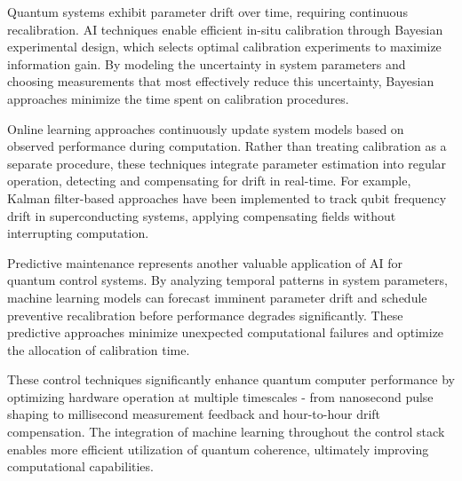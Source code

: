 Quantum systems exhibit parameter drift over time, requiring continuous recalibration. AI techniques enable efficient in-situ calibration through Bayesian experimental design, which selects optimal calibration experiments to maximize information gain. By modeling the uncertainty in system parameters and choosing measurements that most effectively reduce this uncertainty, Bayesian approaches minimize the time spent on calibration procedures.

Online learning approaches continuously update system models based on observed performance during computation. Rather than treating calibration as a separate procedure, these techniques integrate parameter estimation into regular operation, detecting and compensating for drift in real-time. For example, Kalman filter-based approaches have been implemented to track qubit frequency drift in superconducting systems, applying compensating fields without interrupting computation.

Predictive maintenance represents another valuable application of AI for quantum control systems. By analyzing temporal patterns in system parameters, machine learning models can forecast imminent parameter drift and schedule preventive recalibration before performance degrades significantly. These predictive approaches minimize unexpected computational failures and optimize the allocation of calibration time.

These control techniques significantly enhance quantum computer performance by optimizing hardware operation at multiple timescales - from nanosecond pulse shaping to millisecond measurement feedback and hour-to-hour drift compensation. The integration of machine learning throughout the control stack enables more efficient utilization of quantum coherence, ultimately improving computational capabilities. 
